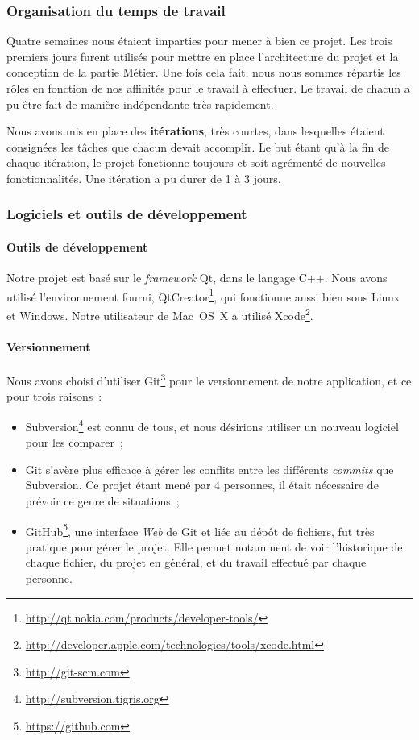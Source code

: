 \subsubsection{Organisation du temps de travail}

Quatre semaines nous étaient imparties pour mener à bien ce projet.
Les trois premiers jours furent utilisés pour mettre en place
l'architecture du projet et la conception de la partie Métier. Une
fois cela fait, nous nous sommes répartis les rôles en fonction de
nos affinités pour le travail à effectuer. Le travail de chacun a
pu être fait de manière indépendante très rapidement.

Nous avons mis en place des \textbf{itérations}, très courtes, dans
lesquelles étaient consignées les tâches que chacun devait
accomplir. Le but étant qu'à la fin de chaque itération, le projet
fonctionne toujours et soit agrémenté de nouvelles
fonctionnalités. Une itération a pu durer de 1 à 3 jours.

\subsubsection{Logiciels et outils de développement}

\paragraph{Outils de développement}

Notre projet est basé sur le \emph{framework} Qt, dans le langage
C++. Nous avons utilisé l'environnement fourni, QtCreator\footnote{\url{http://qt.nokia.com/products/developer-tools/}}, qui
fonctionne aussi bien sous Linux et Windows. Notre utilisateur de
Mac~OS~X a utilisé Xcode\footnote{\url{http://developer.apple.com/technologies/tools/xcode.html}}.

\paragraph{Versionnement}

Nous avons choisi d'utiliser Git\footnote{\url{http://git-scm.com}} pour le versionnement de notre
application, et ce pour trois raisons~:

\begin{itemize}
\item
  Subversion\footnote{\url{http://subversion.tigris.org}} est connu de tous, et nous désirions utiliser un nouveau
  logiciel pour les comparer~;
\item
  Git s'avère plus efficace à gérer les conflits entre les différents
  \emph{commits} que Subversion. Ce projet étant mené par 4 personnes, il
  était nécessaire de prévoir ce genre de situations~;
\item
  GitHub\footnote{\url{https://github.com}}, une interface \emph{Web} de Git et liée au dépôt de
  fichiers, fut très pratique pour gérer le projet. Elle permet
  notamment de voir l'historique de chaque fichier, du projet en
  général, et du travail effectué par chaque personne.
\end{itemize}

